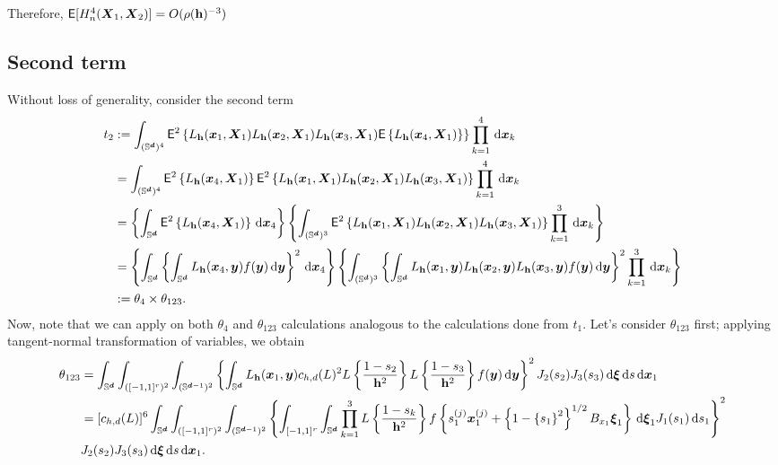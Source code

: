 \documentclass{article}
\begin{document}
Therefore, $\mathsf{E}[H_n^4(\bX_1,\bX_2)]=O(\rho(\bh)^{-3})$


\subsection{Second term}

Without loss of generality, consider the second term
\begin{align*}
    t_2 &\defin \int_{(\Sr)^4} \mathsf{E}^2 \lrb{ L_{\bh} (\bx_1,\bX_1) L_{\bh} (\bx_2,\bX_1) L_{\bh} (\bx_3,\bX_1) \mathsf{E} \lrb{ L_{\bh} (\bx_4,\bX_1)} }\prod_{k=1}^{4} \,\rd \bx_k \\
    &= \int_{(\Sr)^4} \mathsf{E}^2 \lrb{ L_{\bh} (\bx_4,\bX_1)} \mathsf{E}^2 \lrb{ L_{\bh} (\bx_1,\bX_1) L_{\bh} (\bx_2,\bX_1) L_{\bh} (\bx_3,\bX_1) }\prod_{k=1}^{4} \,\rd \bx_k \\
    &= \lrb{ \int_{\Sr} \mathsf{E}^2 \lrb{ L_{\bh} (\bx_4,\bX_1)} \,\rd \bx_4} \lrb{ \int_{(\Sr)^3} \mathsf{E}^2 \lrb{ L_{\bh} (\bx_1,\bX_1) L_{\bh} (\bx_2,\bX_1) L_{\bh} (\bx_3,\bX_1) }\prod_{k=1}^{3} \,\rd \bx_k } \\
    &= \lrb{ \int_{\Sr} \lrb{ \int_{\Sr} L_{\bh} (\bx_4,\by) f(\by) \,\rd \by }^2 \,\rd \bx_4} \lrb{ \int_{(\Sr)^3} \lrb{ \int_{\Sr} L_{\bh} (\bx_1,\by) L_{\bh} (\bx_2,\by) L_{\bh} (\bx_3,\by) f(\by) \,\rd \by}^2 \prod_{k=1}^{3} \,\rd \bx_k } \\
    & \defin \theta_{4} \times \theta_{123}.
\end{align*}
Now, note that we can apply on both $\theta_{4}$ and $\theta_{123}$ calculations analogous to the calculations done from $t_1$. Let's consider $\theta_{123}$ first; applying tangent-normal transformation of variables, we obtain
\begin{align*}
    \theta_{123} &= \int_{\Sr} \int_{([-1,1]^r)^2} \int_{(\Srm)^2} \lrb{ \int_{\Sr}L_{\bh} (\bx_1,\by) c_{h,d}(L)^2 L \lrb{ \frac{1 - s_2}{\bh^2} } L \lrb{ \frac{1 - s_3}{\bh^2} } f(\by) \,\rd \by }^2 J_2(s_2) J_3(s_3) \,\rd \bxi \,\rd s \,\rd \bx_1 \\
    &= [c_{h,d}(L)]^6 \int_{\Sr} \int_{([-1,1]^r)^2} \int_{(\Srm)^2} \lrb{ \int_{[-1,1]^r} \int_{\Sr} \prod_{k=1}^{3} L \lrb{ \frac{1 - s_k}{\bh^2} } f \lrb{ s_1^{(j)} \bx_1^{(j)} + \lrb{1 - \lrb{s_1}^2}^{1/2} B_{x_1} \bxi_1 } \,\rd \bxi_1 J_1(s_1) \,\rd s_1 }^2 \\
    & J_2(s_2) J_3(s_3) \,\rd \bxi \,\rd s \,\rd \bx_1.
\end{align*}
\end{document}
